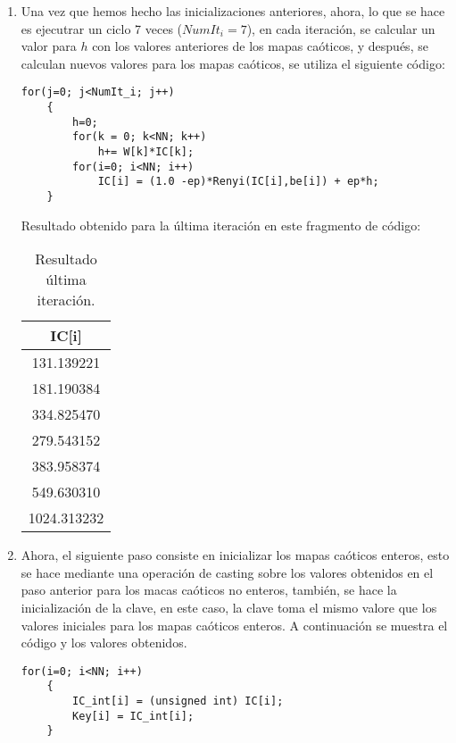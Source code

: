 \documentclass[10pt]{IEEEtran}
\begin{document}
\begin{enumerate}
\begin{table}[H]
\begin{tabular}[c]{|c|c|c|c|c|}
\hline
\hline
\end{tabular}
\end{table}

\item Una vez que hemos hecho las inicializaciones anteriores, ahora, lo que se hace es ejecutrar un ciclo 7 veces ($NumIt_i = 7$), en cada iteración, se calcular un valor para $h$ con los valores anteriores de los mapas caóticos, y después, se calculan nuevos valores para los mapas caóticos, se utiliza el siguiente código:


\begin{verbatim}
for(j=0; j<NumIt_i; j++)
	{
		h=0;
		for(k = 0; k<NN; k++)
			h+= W[k]*IC[k]; 
		for(i=0; i<NN; i++)
			IC[i] = (1.0 -ep)*Renyi(IC[i],be[i]) + ep*h;
	}
\end{verbatim}

Resultado obtenido para la última iteración en este fragmento de código:
\begin{table}[H]
\centering
\caption{Resultado última iteración.}
\begin{tabular}[c]{|c|}
\hline
\hline
 IC[i] 	 \\
\hline
\hline
131.139221 \\
 181.190384 \\ 
 334.825470 \\
 279.543152 \\
 383.958374 \\  
 549.630310 \\
 1024.313232 \\

\hline
\hline
\end{tabular}
\end{table}








\item Ahora, el siguiente paso consiste en inicializar los mapas caóticos enteros, esto se hace mediante una operación de casting sobre los valores obtenidos en el paso anterior para los macas caóticos no enteros, también, se hace la inicialización de la clave, en este caso, la clave toma el mismo valore que los valores iniciales para los mapas caóticos enteros. A continuación se muestra el código y los valores obtenidos.

\begin{verbatim}
for(i=0; i<NN; i++)
	{
		IC_int[i] = (unsigned int) IC[i];
		Key[i] = IC_int[i];
	}
	

\end{verbatim}
\end{enumerate}
\end{document}
